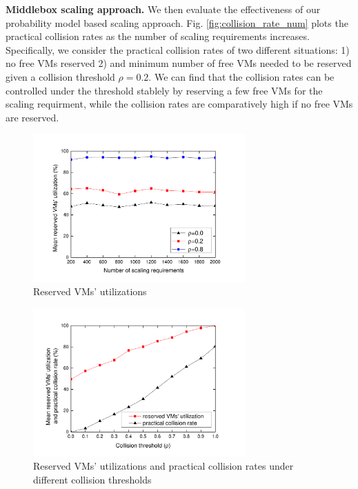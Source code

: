 \documentclass[review]{elsarticle}
\begin{document}
\textbf{Middlebox scaling approach.}
We then evaluate the effectiveness of our probability model based scaling approach. %
Fig. \ref{fig:collision_rate_num} plots the practical collision rates as the number of scaling requirements increases. Specifically, we consider the practical collision rates of two different situations: 1) no free VMs reserved 2) and minimum number of free VMs needed to be reserved given a collision threshold $\rho=0.2$. We can find that the collision rates can be controlled under the threshold stablely by reserving a few free VMs for the scaling requirment, while the collision rates are comparatively high if no free VMs are reserved. 
\begin{figure}%
	\centering 
	\includegraphics[width=3.2in]{fig/vm_util_num_p.pdf}	
	\caption{Reserved VMs' utilizations}
	\label{fig:vm_util_num_p}
\end{figure}
\begin{figure}%
	\centering
	\includegraphics[width=3.2in]{fig/vm_util_p.pdf}	
	\caption{Reserved VMs' utilizations
		and practical collision rates under different collision thresholds}
	\label{fig:vm_util_p}
\end{figure}
\end{document}
